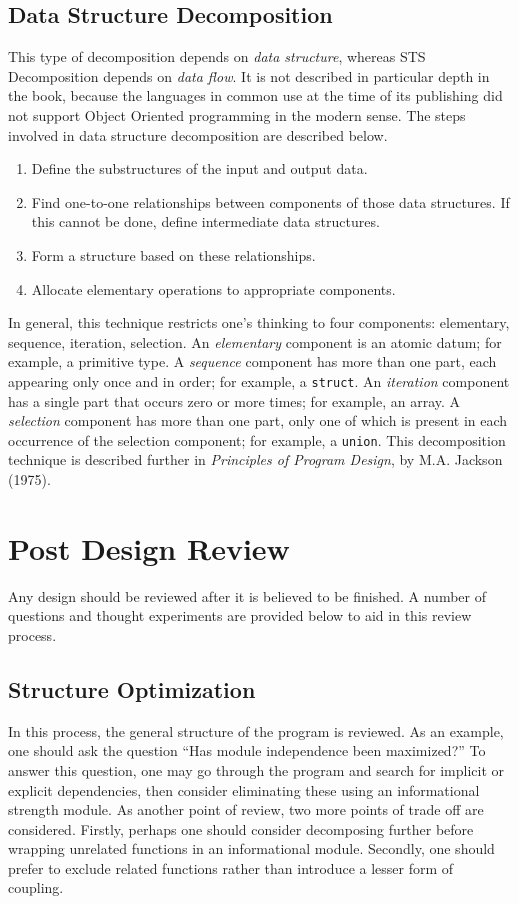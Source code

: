 \documentclass{designdoc}
\begin{document}
\subsection{Data Structure Decomposition}
This type of decomposition depends on {\it data structure}, whereas STS
Decomposition depends on {\it data flow}. It is not described in particular
depth in the book, because the languages in common use at the time of its
publishing did not support Object Oriented programming in the modern sense. The
steps involved in data structure decomposition are described below.
\begin{enumerate}
\item Define the substructures of the input and output data.
\item Find one-to-one relationships between components of those data
  structures. If this cannot be done, define intermediate data structures.
\item Form a structure based on these relationships.
\item Allocate elementary operations to appropriate components.
\end{enumerate}
In general, this technique restricts one's thinking to four components: elementary, sequence, iteration, selection. An {\it elementary} component is an atomic
datum; for example, a primitive type. A {\it sequence} component has more than
one part, each appearing only once and in order; for example, a
\texttt{struct}. An {\it iteration} component has a single part that occurs
zero or more times; for example, an array. A {\it selection} component has more
than one part, only one of which is present in each occurrence of the selection
component; for example, a \texttt{union}. This decomposition technique is
described further in {\it Principles of Program Design}, by M.A. Jackson
(1975).

\section{Post Design Review}
Any design should be reviewed after it is believed to be finished. A number of
questions and thought experiments are provided below to aid in this review
process.

\subsection{Structure Optimization}
In this process, the general structure of the program is reviewed. As an
example, one should ask the question ``Has module independence been
maximized?'' To answer this question, one may go through the program and search
for implicit or explicit dependencies, then consider eliminating these using an
informational strength module. As another point of review, two more points of
trade off are considered. Firstly, perhaps one should consider decomposing
further before wrapping unrelated functions in an informational module.
Secondly, one should prefer to exclude related functions rather than introduce
a lesser form of coupling.
\end{document}
